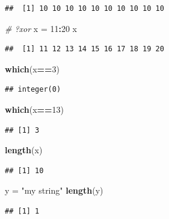 \documentclass[10pt,]{krantz}
\makeatletter
\newenvironment{Shaded}{\begin{snugshade}}{\end{snugshade}}
\newcommand{\KeywordTok}[1]{\textcolor[rgb]{0.13,0.29,0.53}{\textbf{#1}}}
\newcommand{\DecValTok}[1]{\textcolor[rgb]{0.00,0.00,0.81}{#1}}
\newcommand{\StringTok}[1]{\textcolor[rgb]{0.31,0.60,0.02}{#1}}
\newcommand{\CommentTok}[1]{\textcolor[rgb]{0.56,0.35,0.01}{\textit{#1}}}
\newcommand{\OperatorTok}[1]{\textcolor[rgb]{0.81,0.36,0.00}{\textbf{#1}}}
\newcommand{\NormalTok}[1]{#1}
\newenvironment{kframe}{%
\medskip{}
\setlength{\fboxsep}{.8em}
 \def\at@end@of@kframe{}%
 \ifinner\ifhmode%
  \def\at@end@of@kframe{\end{minipage}}%
  \begin{minipage}{\columnwidth}%
 \fi\fi%
 \def\FrameCommand##1{\hskip\@totalleftmargin \hskip-\fboxsep
 \colorbox{shadecolor}{##1}\hskip-\fboxsep
     \hskip-\linewidth \hskip-\@totalleftmargin \hskip\columnwidth}%
 \MakeFramed {\advance\hsize-\width
   \@totalleftmargin\z@ \linewidth\hsize
   \@setminipage}}%
 {\par\unskip\endMakeFramed%
 \at@end@of@kframe}
\renewenvironment{Shaded}{\begin{kframe}}{\end{kframe}}
\makeatother
\begin{document}
\begin{verbatim}
##  [1] 10 10 10 10 10 10 10 10 10 10
\end{verbatim}

\begin{Shaded}
\begin{Highlighting}[]
\CommentTok{# ?xor}
\NormalTok{x =}\StringTok{ }\DecValTok{11}\OperatorTok{:}\DecValTok{20}
\NormalTok{x}
\end{Highlighting}
\end{Shaded}

\begin{verbatim}
##  [1] 11 12 13 14 15 16 17 18 19 20
\end{verbatim}

\begin{Shaded}
\begin{Highlighting}[]
\KeywordTok{which}\NormalTok{(x}\OperatorTok{==}\DecValTok{3}\NormalTok{)}
\end{Highlighting}
\end{Shaded}

\begin{verbatim}
## integer(0)
\end{verbatim}

\begin{Shaded}
\begin{Highlighting}[]
\KeywordTok{which}\NormalTok{(x}\OperatorTok{==}\DecValTok{13}\NormalTok{)}
\end{Highlighting}
\end{Shaded}

\begin{verbatim}
## [1] 3
\end{verbatim}

\begin{Shaded}
\begin{Highlighting}[]
\KeywordTok{length}\NormalTok{(x)}
\end{Highlighting}
\end{Shaded}

\begin{verbatim}
## [1] 10
\end{verbatim}

\begin{Shaded}
\begin{Highlighting}[]
\NormalTok{y =}\StringTok{ "my string"}
\KeywordTok{length}\NormalTok{(y)}
\end{Highlighting}
\end{Shaded}

\begin{verbatim}
## [1] 1
\end{verbatim}
\end{document}
